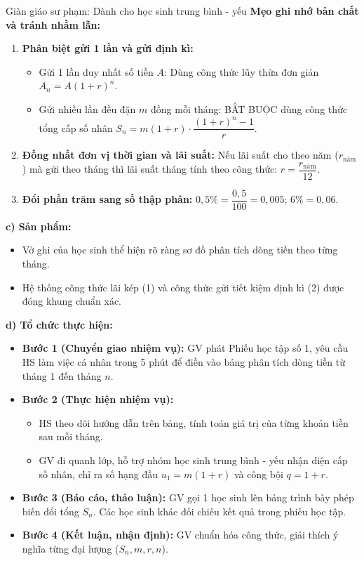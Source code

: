 \documentclass[12pt, a4paper]{article}
\begin{document}
\begin{scaffoldbox}{Giàn giáo sư phạm: Dành cho học sinh trung bình - yếu}
    \textbf{Mẹo ghi nhớ bản chất và tránh nhầm lẫn:}
    \begin{enumerate}
        \item \textbf{Phân biệt gửi 1 lần và gửi định kì:}
        \begin{itemize}
            \item Gửi 1 lần duy nhất số tiền $A$: Dùng công thức lũy thừa đơn giản $A_n = A(1+r)^n$.
            \item Gửi nhiều lần đều đặn $m$ đồng mỗi tháng: BẮT BUỘC dùng công thức tổng cấp số nhân $S_n = m(1+r) \cdot \dfrac{(1+r)^n - 1}{r}$.
        \end{itemize}
        \item \textbf{Đồng nhất đơn vị thời gian và lãi suất:} Nếu lãi suất cho theo năm ($r_{\text{năm}}$) mà gửi theo tháng thì lãi suất tháng tính theo công thức: $r = \dfrac{r_{\text{năm}}}{12}$.
        \item \textbf{Đổi phần trăm sang số thập phân:} $0{,}5\% = \dfrac{0{,}5}{100} = 0{,}005$; $6\% = 0{,}06$.
    \end{enumerate}
\end{scaffoldbox}

\noindent \textbf{c) Sản phẩm:}
\begin{itemize}
    \item Vở ghi của học sinh thể hiện rõ ràng sơ đồ phân tích dòng tiền theo từng tháng.
    \item Hệ thống công thức lãi kép (1) và công thức gửi tiết kiệm định kì (2) được đóng khung chuẩn xác.
\end{itemize}

\noindent \textbf{d) Tổ chức thực hiện:}
\begin{itemize}
    \item \textbf{Bước 1 (Chuyển giao nhiệm vụ):} GV phát Phiếu học tập số 1, yêu cầu HS làm việc cá nhân trong 5 phút để điền vào bảng phân tích dòng tiền từ tháng 1 đến tháng $n$.
    \item \textbf{Bước 2 (Thực hiện nhiệm vụ):}
    \begin{itemize}
        \item HS theo dõi hướng dẫn trên bảng, tính toán giá trị của từng khoản tiền sau mỗi tháng.
        \item GV đi quanh lớp, hỗ trợ nhóm học sinh trung bình - yếu nhận diện cấp số nhân, chỉ ra số hạng đầu $u_1 = m(1+r)$ và công bội $q = 1+r$.
    \end{itemize}
    \item \textbf{Bước 3 (Báo cáo, thảo luận):} GV gọi 1 học sinh lên bảng trình bày phép biến đổi tổng $S_n$. Các học sinh khác đối chiếu kết quả trong phiếu học tập.
    \item \textbf{Bước 4 (Kết luận, nhận định):} GV chuẩn hóa công thức, giải thích ý nghĩa từng đại lượng ($S_n, m, r, n$).
\end{itemize}
\end{document}
